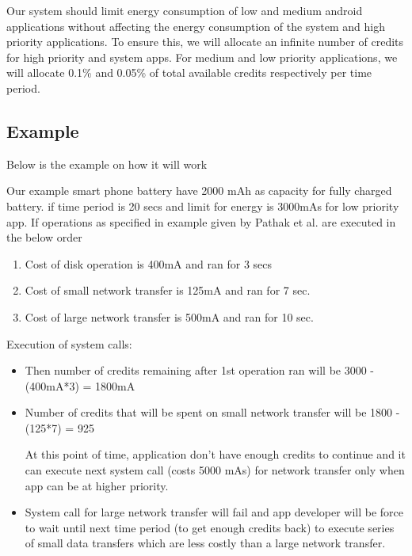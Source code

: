 Our system should limit energy consumption of low and medium android applications without affecting the energy consumption of the system and high priority applications. To ensure this, we will allocate an infinite number of credits for high priority and system apps. For medium and low priority applications, we will allocate 0.1\% and 0.05\% of total available credits respectively per time period. 

\subsection{Example}
Below is the example on how it will work

Our example smart phone battery have 2000 mAh as capacity for fully charged battery. if time period is 20 secs and limit for energy is 3000mAs for low priority app. If operations as specified in example given by Pathak et al. are executed in the below order

\begin{enumerate}
\item Cost of disk operation is 400mA and ran for 3 secs
\item Cost of small network transfer is 125mA and ran for 7 sec.
\item Cost of large network transfer is 500mA and ran for 10 sec.
\end{enumerate}

Execution of system calls:

\begin{itemize}

\item Then number of credits remaining after 1st operation ran will be 3000 - (400mA*3) = 1800mA

\item Number of credits that will be spent on small network transfer will be 1800 - (125*7) = 925

At this point of time, application don't have enough credits to continue and it can execute next system call (costs 5000 mAs) for network transfer only when app can be at higher priority.

\item System call for large network transfer will fail and app developer will be force to wait until next time period (to get enough credits back) to execute series of small data transfers which are less costly than a large network transfer.

\end{itemize}


